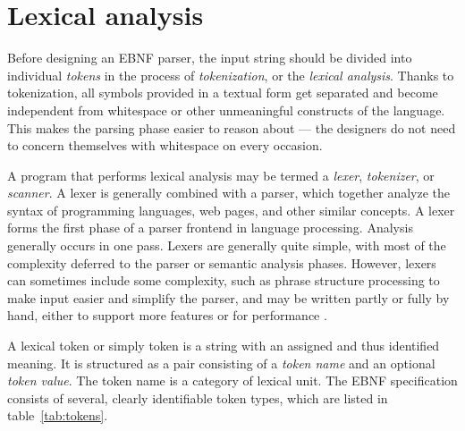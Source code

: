 \documentclass[english,engineering]{wizthesis}
\begin{document}
\section{Lexical analysis} \label{sec:lexing}

Before designing an EBNF parser, the input string should be divided into
individual \emph{tokens} in the process of \emph{tokenization}, or the
\emph{lexical analysis}. Thanks to tokenization, all symbols provided in a
textual form get separated and become independent from whitespace or other
unmeaningful constructs of the language. This makes the parsing phase easier to
reason about --- the designers do not need to concern themselves with whitespace
on every occasion.

A program that performs lexical analysis may be termed a \emph{lexer},
\emph{tokenizer}, or \emph{scanner}. A lexer is generally combined with a
parser, which together analyze the syntax of programming languages, web pages,
and other similar concepts. A lexer forms the first phase of a parser frontend
in language processing. Analysis generally occurs in one pass. Lexers are
generally quite simple, with most of the complexity deferred to the parser or
semantic analysis phases. However, lexers can sometimes include some complexity,
such as phrase structure processing to make input easier and simplify the
parser, and may be written partly or fully by hand, either to support more
features or for performance \cite{sipser-2009}.

A lexical token or simply token is a string with an assigned and thus identified
meaning. It is structured as a pair consisting of a \emph{token name} and an
optional \emph{token value}. The token name is a category of lexical unit. The
EBNF specification consists of several, clearly identifiable token types, which
are listed in table~\ref{tab:tokens}.
\end{document}
